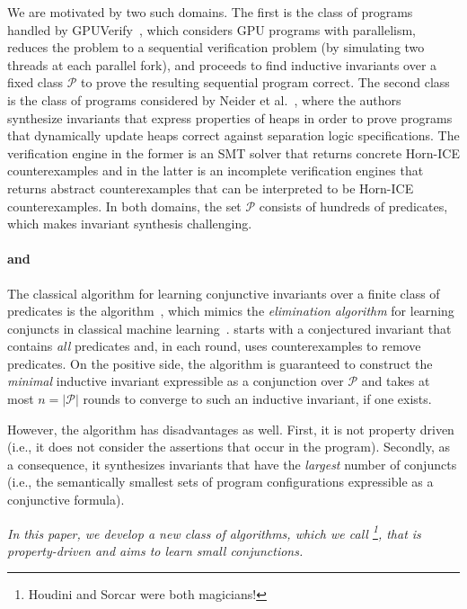 We are motivated by two such domains. The first is the class of programs handled by GPUVerify~\cite{DBLP:conf/oopsla/BettsCDQT12,DBLP:conf/oopsla/ChongDKKQ13}, which considers GPU programs with parallelism, reduces the problem to a sequential verification problem (by simulating two threads at each parallel fork), and proceeds to find inductive invariants over a fixed class $\mathcal P$ to prove the resulting sequential program correct.
The second class is the class of programs considered by Neider et al.~\cite{DBLP:conf/tacas/Neider0MS018}, where the authors synthesize invariants that express properties of heaps in order to prove programs that dynamically update heaps correct against separation logic specifications.
The verification engine in the former is an SMT solver that returns concrete Horn-ICE counterexamples and in the latter is an incomplete verification engines that returns abstract counterexamples that can be interpreted to be Horn-ICE counterexamples. 
In both domains, the set $\mathcal P$ consists of hundreds of predicates, which makes invariant synthesis challenging.

\paragraph{\bfseries \houdini and \sorcar}
The classical algorithm for learning conjunctive invariants over a finite class of predicates is the \houdini algorithm~\cite{DBLP:conf/fm/FlanaganL01}, which mimics the \emph{elimination algorithm} for learning conjuncts in classical machine learning~\cite{Kearns:1994:ICL:200548}.
\houdini starts with a conjectured invariant that contains \emph{all} predicates and, in each round, uses counterexamples to remove predicates.
On the positive side, the algorithm is guaranteed to construct the \emph{minimal} inductive invariant expressible as a conjunction over $\mathcal P$ and takes at most $n=|\mathcal P|$ rounds to converge to such an inductive invariant, if one exists. 

However, the \houdini algorithm has disadvantages as well.
First, it is not property driven (i.e., it does not consider the assertions that occur in the program).
Secondly, as a consequence, it synthesizes invariants that have the \emph{largest} number of conjuncts (i.e., the semantically smallest sets of program configurations expressible as a conjunctive formula).

\emph{In this paper, we develop a new class of algorithms, which we call \sorcar\footnote{Houdini and Sorcar were both magicians!}, that is \emph{property-driven} and aims to learn \emph{small conjunctions}.} 

